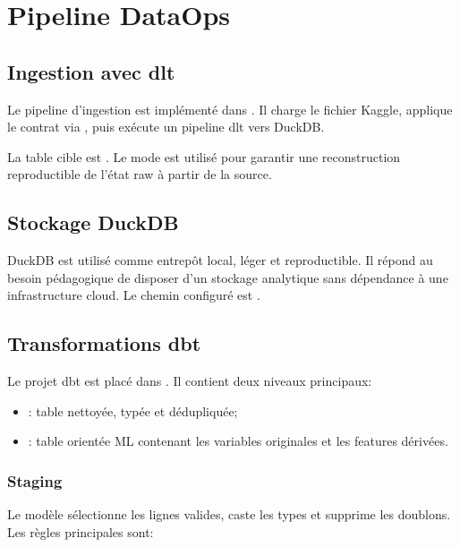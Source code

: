 \chapter{Pipeline DataOps}

\section{Ingestion avec dlt}

Le pipeline d'ingestion est implémenté dans . Il charge le fichier Kaggle, applique le contrat via , puis exécute un pipeline dlt vers DuckDB.

La table cible est . Le mode  est utilisé pour garantir une reconstruction reproductible de l'état raw à partir de la source.

\section{Stockage DuckDB}

DuckDB est utilisé comme entrepôt local, léger et reproductible. Il répond au besoin pédagogique de disposer d'un stockage analytique sans dépendance à une infrastructure cloud. Le chemin configuré est .

\section{Transformations dbt}

Le projet dbt est placé dans . Il contient deux niveaux principaux:

\begin{itemize}
    \item {}: table nettoyée, typée et dédupliquée;
    \item {}: table orientée ML contenant les variables originales et les features dérivées.
\end{itemize}

\subsection{Staging}

Le modèle  sélectionne les lignes valides, caste les types et supprime les doublons. Les règles principales sont:


